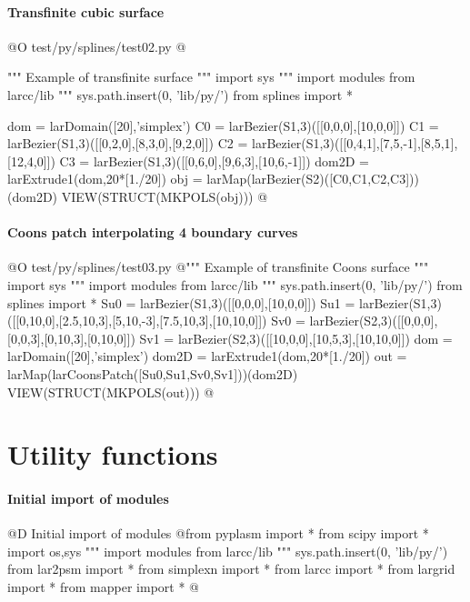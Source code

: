\documentclass[11pt,oneside]{article}	%
\begin{document}
\paragraph{Transfinite cubic surface}

@O test/py/splines/test02.py  
@{""" Example of transfinite surface """
import sys
""" import modules from larcc/lib """
sys.path.insert(0, 'lib/py/')
from splines import *

dom = larDomain([20],'simplex')
C0 = larBezier(S1,3)([[0,0,0],[10,0,0]])
C1 = larBezier(S1,3)([[0,2,0],[8,3,0],[9,2,0]])
C2 = larBezier(S1,3)([[0,4,1],[7,5,-1],[8,5,1],[12,4,0]])
C3 = larBezier(S1,3)([[0,6,0],[9,6,3],[10,6,-1]])
dom2D = larExtrude1(dom,20*[1./20])
obj = larMap(larBezier(S2)([C0,C1,C2,C3]))(dom2D)
VIEW(STRUCT(MKPOLS(obj)))
@}

\paragraph{Coons patch interpolating 4 boundary curves}

@O test/py/splines/test03.py  
@{""" Example of transfinite Coons surface """
import sys
""" import modules from larcc/lib """
sys.path.insert(0, 'lib/py/')
from splines import *
Su0 = larBezier(S1,3)([[0,0,0],[10,0,0]])
Su1 = larBezier(S1,3)([[0,10,0],[2.5,10,3],[5,10,-3],[7.5,10,3],[10,10,0]])
Sv0 = larBezier(S2,3)([[0,0,0],[0,0,3],[0,10,3],[0,10,0]])
Sv1 = larBezier(S2,3)([[10,0,0],[10,5,3],[10,10,0]])
dom = larDomain([20],'simplex')
dom2D = larExtrude1(dom,20*[1./20])
out = larMap(larCoonsPatch([Su0,Su1,Sv0,Sv1]))(dom2D)
VIEW(STRUCT(MKPOLS(out)))
@}



\appendix
\section{Utility functions}

\paragraph{Initial import of modules}

@D Initial import of modules
@{from pyplasm import *
from scipy import *
import os,sys
""" import modules from larcc/lib """
sys.path.insert(0, 'lib/py/')
from lar2psm import *
from simplexn import *
from larcc import *
from largrid import *
from mapper import *
@}




\end{document}
